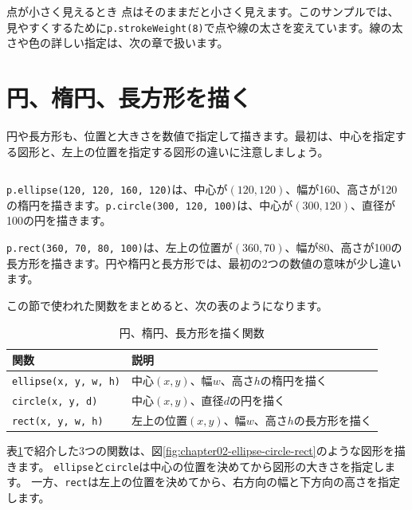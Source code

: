 \begin{notebox}{点が小さく見えるとき}
点はそのままだと小さく見えます。このサンプルでは、見やすくするために\texttt{p.strokeWeight(8)}で点や線の太さを変えています。線の太さや色の詳しい指定は、次の章で扱います。
\end{notebox}

\section{円、楕円、長方形を描く}

円や長方形も、位置と大きさを数値で指定して描きます。最初は、中心を指定する図形と、左上の位置を指定する図形の違いに注意しましょう。

\begin{listing}[htbp]
\inputminted{ts}{typescript-p5/listings/chapter02/ellipses-and-rectangles.ts}
\caption{円、楕円、長方形を描く（\texttt{chapter02/ellipses-and-rectangles.ts}）}
\label{lst:chapter02-ellipses-and-rectangles}
\end{listing}

\texttt{p.ellipse(120, 120, 160, 120)}は、中心が$(120, 120)$、幅が160、高さが120の楕円を描きます。\texttt{p.circle(300, 120, 100)}は、中心が$(300, 120)$、直径が100の円を描きます。

\texttt{p.rect(360, 70, 80, 100)}は、左上の位置が$(360, 70)$、幅が80、高さが100の長方形を描きます。円や楕円と長方形では、最初の2つの数値の意味が少し違います。

この節で使われた関数をまとめると、次の表のようになります。

\begin{table}[htbp]
\centering
\begin{tabular}{ll}
\toprule
関数 & 説明 \\
\midrule
\texttt{ellipse(x, y, w, h)} & 中心$(x, y)$、幅$w$、高さ$h$の楕円を描く \\
\texttt{circle(x, y, d)} & 中心$(x, y)$、直径$d$の円を描く \\
\texttt{rect(x, y, w, h)} & 左上の位置$(x, y)$、幅$w$、高さ$h$の長方形を描く \\
\bottomrule
\end{tabular}
\caption{円、楕円、長方形を描く関数}
\label{tab:chapter02-ellipses-and-rectangles}
\end{table}

表\ref{tab:chapter02-ellipses-and-rectangles}で紹介した3つの関数は、図\ref{fig:chapter02-ellipse-circle-rect}のような図形を描きます。
\texttt{ellipse}と\texttt{circle}は中心の位置を決めてから図形の大きさを指定します。
一方、\texttt{rect}は左上の位置を決めてから、右方向の幅と下方向の高さを指定します。

